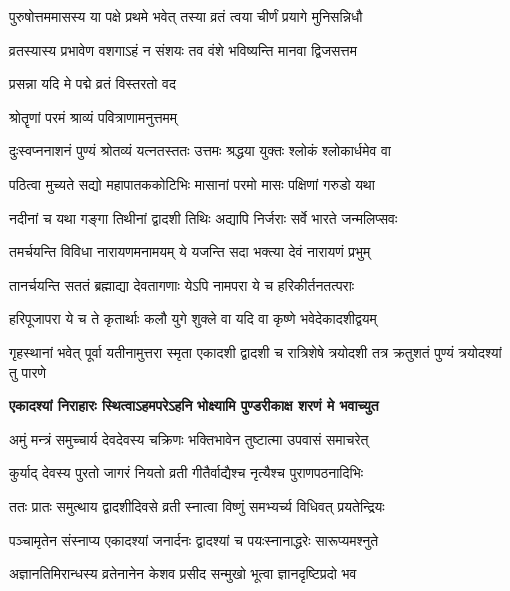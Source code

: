 \twolineshloka
{पुरुषोत्तममासस्य या पक्षे प्रथमे भवेत्}
{तस्या व्रतं त्वया चीर्णं प्रयागे मुनिसन्निधौ}%

\twolineshloka
{व्रतस्यास्य प्रभावेण वशगाऽहं न संशयः}
{तव वंशे भविष्यन्ति मानवा द्विजसत्तम}%


\onelineshloka
{प्रसन्ना यदि मे पद्मे व्रतं विस्तरतो वद}%

\onelineshloka
{श्रोतॄणां परमं श्राव्यं पवित्राणामनुत्तमम्}%

\twolineshloka
{दुःस्वप्ननाशनं पुण्यं श्रोतव्यं यत्नतस्ततः}
{उत्तमः श्रद्धया युक्तः श्लोकं श्लोकार्धमेव वा}%

\twolineshloka
{पठित्वा मुच्यते सद्यो महापातककोटिभिः}
{मासानां परमो मासः पक्षिणां गरुडो यथा}%

\twolineshloka
{नदीनां च यथा गङ्गा तिथीनां द्वादशी तिथिः}
{अद्यापि निर्जराः सर्वे भारते जन्मलिप्सवः}%

\twolineshloka
{तमर्चयन्ति विविधा नारायणमनामयम्}
{ये यजन्ति सदा भक्त्या देवं नारायणं प्रभुम्}%

\twolineshloka
{तानर्चयन्ति सततं ब्रह्माद्या देवतागणाः}
{येऽपि नामपरा ये च हरिकीर्तनतत्पराः}%

\twolineshloka
{हरिपूजापरा ये च ते कृतार्थाः कलौ युगे}
{शुक्ले वा यदि वा कृष्णे भवेदेकादशीद्वयम्}%

\threelineshloka
{गृहस्थानां भवेत् पूर्वा यतीनामुत्तरा स्मृता}
{एकादशी द्वादशी च रात्रिशेषे त्रयोदशी}
{तत्र क्रतुशतं पुण्यं त्रयोदश्यां तु पारणे}%

\twolineshloka
{\textbf{एकादश्यां निराहारः स्थित्वाऽहमपरेऽहनि}}
{\textbf{भोक्ष्यामि पुण्डरीकाक्ष शरणं मे भवाच्युत}}%

\twolineshloka
{अमुं मन्त्रं समुच्चार्य देवदेवस्य चक्रिणः}
{भक्तिभावेन तुष्टात्मा उपवासं समाचरेत्}%

\twolineshloka
{कुर्याद् देवस्य पुरतो जागरं नियतो व्रती}
{गीतैर्वाद्यैश्च नृत्यैश्च पुराणपठनादिभिः}%

\twolineshloka
{ततः प्रातः समुत्थाय द्वादशीदिवसे व्रती}
{स्नात्वा विष्णुं समभ्यर्च्य विधिवत् प्रयतेन्द्रियः}%

\twolineshloka
{पञ्चामृतेन संस्नाप्य एकादश्यां जनार्दनः}
{द्वादश्यां च पयःस्नानाद्धरेः सारूप्यमश्नुते}%

\twolineshloka
{अज्ञानतिमिरान्धस्य व्रतेनानेन केशव}
{प्रसीद सन्मुखो भूत्वा ज्ञानदृष्टिप्रदो भव}%

